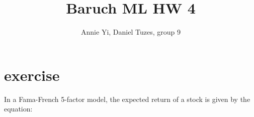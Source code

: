 \documentclass{article}
\title{Baruch ML HW 4}
\author{Annie Yi, Daniel Tuzes, group 9}
\begin{document}
\maketitle
\section{exercise}
In a Fama-French 5-factor model, the expected return of a stock is given by the equation:
\end{document}
